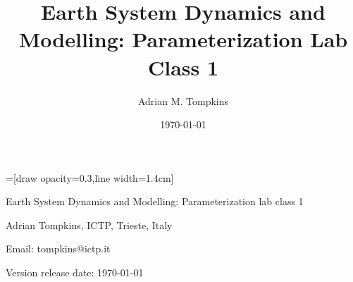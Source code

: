 
\usepackage{makeidx}
\usepackage{courier}
\usepackage{natbib}

\usepackage{tikz}
\usetikzlibrary{arrows}
=[draw opacity=0.3,line width=1.4cm]

\def\newblock{\hskip .11em plus .33em minus .07em}

\makeindex

\title{Earth System Dynamics and Modelling: Parameterization Lab Class
1}
\author{Adrian M. Tompkins}
\date{\today}



%
%

\begin{centering} 

\vspace{2cm}

{\Huge Earth System Dynamics and Modelling: Parameterization lab class
  1 }

\vspace{0.8cm}

{\Large Adrian Tompkins, ICTP, Trieste, Italy}

\vspace{0.5cm}

{\Large Email: tompkins@ictp.it}
\vspace{0.5cm}

{\large Version release date: \today}
\vspace{0.5cm}

\end{centering}

\noindent 

\tableofcontents
\setcounter{tocdepth}{3}


\mode*
